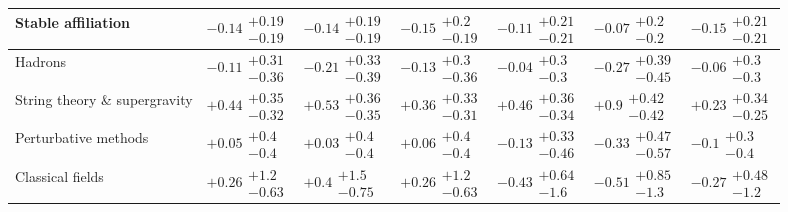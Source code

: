 \begin{table}[H]
\begin{tabular}{lllllll}
\textbf{Stable affiliation}               &       $-0.14\substack{+0.19 \\ -0.19}$ &       $-0.14\substack{+0.19 \\ -0.19}$ &        $-0.15\substack{+0.2 \\ -0.19}$ &       $-0.11\substack{+0.21 \\ -0.21}$ &         $-0.07\substack{+0.2 \\ -0.2}$ &       $-0.15\substack{+0.21 \\ -0.21}$ \\
\hline Hadrons                                   &       $-0.11\substack{+0.31 \\ -0.36}$ &       $-0.21\substack{+0.33 \\ -0.39}$ &        $-0.13\substack{+0.3 \\ -0.36}$ &         $-0.04\substack{+0.3 \\ -0.3}$ &       $-0.27\substack{+0.39 \\ -0.45}$ &         $-0.06\substack{+0.3 \\ -0.3}$ \\
String theory \& supergravity             &  $\bm{+0.44}\substack{+0.35 \\ -0.32}$ &  $\bm{+0.53}\substack{+0.36 \\ -0.35}$ &  $\bm{+0.36}\substack{+0.33 \\ -0.31}$ &  $\bm{+0.46}\substack{+0.36 \\ -0.34}$ &   $\bm{+0.9}\substack{+0.42 \\ -0.42}$ &       $+0.23\substack{+0.34 \\ -0.25}$ \\
Perturbative methods                      &         $+0.05\substack{+0.4 \\ -0.4}$ &         $+0.03\substack{+0.4 \\ -0.4}$ &         $+0.06\substack{+0.4 \\ -0.4}$ &       $-0.13\substack{+0.33 \\ -0.46}$ &       $-0.33\substack{+0.47 \\ -0.57}$ &          $-0.1\substack{+0.3 \\ -0.4}$ \\
Classical fields                          &        $+0.26\substack{+1.2 \\ -0.63}$ &         $+0.4\substack{+1.5 \\ -0.75}$ &        $+0.26\substack{+1.2 \\ -0.63}$ &        $-0.43\substack{+0.64 \\ -1.6}$ &        $-0.51\substack{+0.85 \\ -1.3}$ &        $-0.27\substack{+0.48 \\ -1.2}$ \\

\end{tabular}
\end{table}
